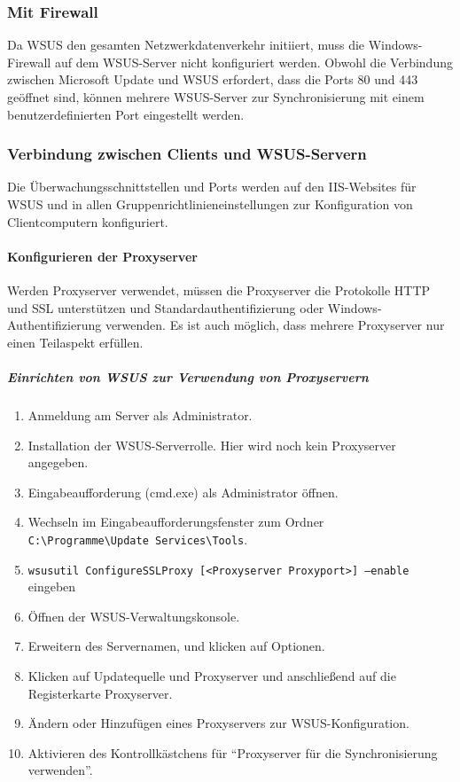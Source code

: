 \documentclass{preset/school}
\begin{document}
\subsubsection{Mit Firewall}
Da WSUS den gesamten Netzwerkdatenverkehr initiiert, muss die Windows-Firewall auf dem WSUS-Server nicht konfiguriert werden.
Obwohl die Verbindung zwischen Microsoft Update und WSUS erfordert, dass die Ports 80 und 443 geöffnet sind, können mehrere WSUS-Server zur Synchronisierung mit einem benutzerdefinierten Port eingestellt werden.

\subsubsection{Verbindung zwischen Clients und WSUS-Servern}
Die Überwachungsschnittstellen und Ports werden auf den IIS-Websites für WSUS und in allen Gruppenrichtlinieneinstellungen zur Konfiguration von Clientcomputern konfiguriert.

\paragraph{Konfigurieren der Proxyserver}
Werden Proxyserver verwendet, müssen die Proxyserver die Protokolle HTTP und SSL unterstützen und Standardauthentifizierung oder Windows-Authentifizierung verwenden.
Es ist auch möglich, dass mehrere Proxyserver nur einen Teilaspekt erfüllen.

\subparagraph{Einrichten von WSUS zur Verwendung von Proxyservern}
\begin{enumerate}
    \item Anmeldung am Server als Administrator.
    \item Installation der WSUS-Serverrolle. Hier wird noch kein Proxyserver angegeben.
    \item Eingabeaufforderung (cmd.exe) als Administrator öffnen.
    \item Wechseln im Eingabeaufforderungsfenster zum Ordner\\
    \texttt{C:\textbackslash{}Programme\textbackslash{}Update Services\textbackslash{}Tools}.
    \item \texttt{wsusutil ConfigureSSLProxy [<Proxyserver Proxyport>] –enable} eingeben
    \item Öffnen der WSUS-Verwaltungskonsole.
    \item Erweitern des Servernamen, und klicken auf Optionen.
    \item Klicken auf Updatequelle und Proxyserver und anschließend auf die Registerkarte Proxyserver.
    \item Ändern oder Hinzufügen eines Proxyservers zur WSUS-Konfiguration.
    \item Aktivieren des Kontrollkästchens für ``Proxyserver für die Synchronisierung verwenden''.
\end{enumerate}
\end{document}
